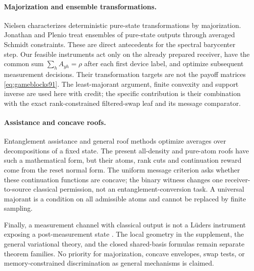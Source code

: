 \paragraph{Majorization and ensemble transformations.}
Nielsen \cite{Nielsen94} characterizes deterministic pure-state
transformations by majorization.  Jonathan and Plenio
\cite[Theorem~1]{JonathanPlenio94} treat ensembles of pure-state
outputs through averaged Schmidt constraints.  These are direct
antecedents for the spectral barycenter step.  Our feasible
instruments act only on the already prepared receiver, have the common
sum $\sum_hA_{yh}=\rho$ after each first device label, and optimize
subsequent measurement decisions.  Their transformation targets are
not the payoff matrices \eqref{eq:gameblocks91}.  The least-majorant
argument, finite convexity and support inverse are used here with
credit; the specific contribution is their combination with the exact
rank-constrained filtered-swap leaf and its message comparator.

\paragraph{Assistance and concave roofs.}
Entanglement assistance \cite{Assistance94} and general roof methods
\cite{Uhlmann91} optimize averages over decompositions of a fixed
state.  The present all-density and pure-atom roofs have such a
mathematical form, but their atoms, rank cuts and continuation reward
come from the reset normal form.  The uniform message criterion asks
whether these continuation functions are concave; the binary witness
changes one receiver-to-source classical permission, not an
entanglement-conversion task.  A universal majorant is a condition on
all admissible atoms and cannot be replaced by finite sampling.

Finally, a measurement channel with classical output is not a L\"uders
instrument exposing a post-measurement state \cite{EQ90}.
The local geometry in the supplement, the general variational theory,
and the closed shared-basis formulas remain separate theorem families.
No priority for majorization, concave envelopes, swap tests, or
memory-constrained discrimination as general mechanisms is claimed.
